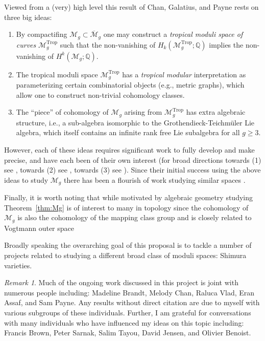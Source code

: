 \documentclass[11pt,reqno]{amsart}
\theoremstyle{remark}
\newtheorem{remark}[lemma]{Remark}
\newcommand{\QQ}{\mathbb{Q}}
\newcommand{\cM}{\mathcal{M}}
\DeclareMathOperator{\trop}{Trop}
\begin{document}
Viewed from a (very) high level this result of Chan, Galatius, and Payne rests on three big ideas:
\begin{enumerate}
\item By compactifing $\cM_{g} \subset \overline{\mathcal{M}}_{g}$ one may construct a \emph{tropical moduli space of curves} $\cM_{g}^{\trop}$ such that the non-vanishing of $H_{k}(\cM_{g}^{\trop}; \QQ)$ implies the non-vanishing of $H^{k}(\mathcal{M}_{g}; \QQ)$.
\item The tropical moduli space $\cM_{g}^{\trop}$ has a \emph{tropical modular} interpretation as parameterizing certain combinatorial objects (e.g., metric graphs), which allow one to construct non-trivial cohomology classes.
\item The ``piece'' of cohomology of $\cM_{g}$ arising from $\cM_{g}^{\trop}$ has extra algebraic structure, i.e., a sub-algebra isomorphic to the Grothendieck-Teichm\"{u}ler Lie algebra, which itself contains an infinite rank free Lie subalgebra for all $g\geq 3$. 
\end{enumerate}

However, each of these ideas requires significant work to fully develop and make precise, and have each been of their own interest (for broad directions towards (1) see \cite{Caporaso13,ACP15,ulirsch17,payne13,Ulirsch19,ACGHOS13,BPR16,CT09,ulirsch17}, towards (2) see \cite{CCUW20,Caporaso12,GKM09,GM07,GM08,Mikhalkin05,chan12,BMV11}, towards (3) see \cite{BV23,BW24,FNW23,Willwacher22,Willwacher15,Kontsevich93,Kontsevich,brown21,BS24}). Since their initial success using the above ideas to study $\cM_{g}$ there has been a flourish of work studying similar spaces \cite{brandChanKannan24, KSY24,kannan21,KLSY23,CCGP23,chan22,CGP22,bibbyGadish18}.

Finally, it is worth noting that while motivated by algebraic geometry studying Theorem~\ref{thm:Mg} is of interest to many in topology since the cohomology of $\cM_{g}$ is also the cohomology of the mapping class group \cite{BBP24,CFP12,CFP14,harer86} and  is closely related to Vogtmann outer space \cite{hatcher95,JV03,CGV05,vogtmann15,BV23}

Broadly speaking the overarching goal of this proposal is to tackle a number of projects related to studying a different broad class of moduli spaces: Shimura varieties.

\begin{remark}
Much of the ongoing work discussed in this project is joint with numerous people including: Madeline Brandt, Melody Chan, Raluca Vlad, Eran Assaf, and Sam Payne. Any results without direct citation are due to myself with various subgroups of these individuals. Further, I am grateful for conversations with many individuals who have influenced my ideas on this topic including: Francis Brown, Peter Sarnak, Salim Tayou, David Jensen, and Olivier Benoist.
\end{remark}
\end{document}

